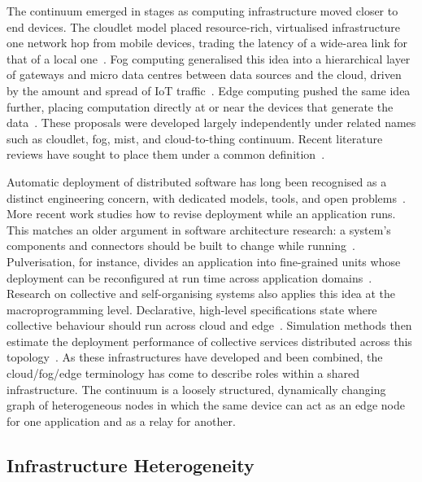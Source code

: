 The continuum emerged in stages as computing infrastructure moved closer to end devices.
%
The cloudlet model placed resource-rich,
virtualised infrastructure one network hop from mobile devices,
trading the latency of a wide-area link for that of a local one~\cite{DBLP:journals/pervasive/SatyanarayananBCD09}.
%
Fog computing generalised this idea into a hierarchical layer of gateways and micro data centres between data sources and the cloud,
driven by the amount and spread of \ac{IoT} traffic~\cite{DBLP:conf/sigcomm/BonomiMZA12}.
%
Edge computing pushed the same idea further,
placing computation directly at or near the devices that generate the data~\cite{DBLP:journals/iotj/ShiCZLX16,DBLP:journals/computer/Satyanarayanan17}.
%
These proposals were developed largely independently under related names such as cloudlet, fog, mist, and cloud-to-thing continuum.
Recent literature reviews have sought to place them under a common definition~\cite{DBLP:journals/access/MoreschiniPLNHT22}.

Automatic deployment of distributed software has long been recognised as a distinct engineering concern,
with dedicated models,
tools,
and open problems~\cite{DBLP:journals/jss/ArcangeliBL15}.
%
More recent work studies how to revise deployment while an application runs.
%
This matches an older argument in software architecture research: a system's components and connectors should be built to change while running~\cite{DBLP:conf/icse/KramerM07}.
%
Pulverisation, for instance, divides an application into fine-grained units whose deployment can be reconfigured at run time across application domains~\cite{DBLP:journals/fi/CasadeiPPVW20,DBLP:journals/fgcs/FarabegoliPCV24}.
%
Research on collective and self-organising systems also applies this idea at the macroprogramming level.
Declarative, high-level specifications state where collective behaviour should run across cloud and edge~\cite{DBLP:conf/acsos/FarabegoliVC24}.
Simulation methods then estimate the deployment performance of collective services distributed across this topology~\cite{DBLP:journals/iotj/CasadeiFPPSV22}.
%
As these infrastructures have developed and been combined,
the cloud/fog/edge terminology has come to describe roles within a shared infrastructure.
The continuum is a loosely structured, dynamically changing graph of heterogeneous nodes
in which the same device can act as an edge node for one application and as a relay for another.

\subsection{Infrastructure Heterogeneity}
\label{subsec:continuum-characteristics}

